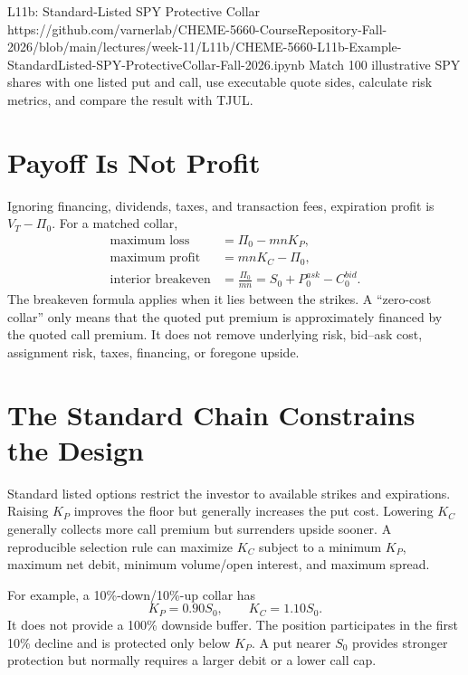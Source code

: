 \documentclass[11pt]{article}
\begin{document}
\notebooklink
  {L11b: Standard-Listed SPY Protective Collar}
  {https://github.com/varnerlab/CHEME-5660-CourseRepository-Fall-2026/blob/main/lectures/week-11/L11b/CHEME-5660-L11b-Example-StandardListed-SPY-ProtectiveCollar-Fall-2026.ipynb}
  {Match 100 illustrative SPY shares with one listed put and call, use executable quote sides, calculate risk metrics, and compare the result with TJUL.}

\section{Payoff Is Not Profit}

Ignoring financing, dividends, taxes, and transaction fees, expiration profit
is $V_T-\Pi_0$. For a matched collar,
\begin{align}
  \label{eq:risk-metrics}
  \text{maximum loss}
    &=\Pi_0-mnK_P,\\
  \text{maximum profit}
    &=mnK_C-\Pi_0,\\
  \text{interior breakeven}
    &=\frac{\Pi_0}{mn}
      =S_0+P_0^{ask}-C_0^{bid}.
\end{align}
The breakeven formula applies when it lies between the strikes. A ``zero-cost
collar'' only means that the quoted put premium is approximately financed by
the quoted call premium. It does not remove underlying risk, bid--ask cost,
assignment risk, taxes, financing, or foregone upside.

\section{The Standard Chain Constrains the Design}

Standard listed options restrict the investor to available strikes and
expirations. Raising $K_P$ improves the floor but generally increases the put
cost. Lowering $K_C$ generally collects more call premium but surrenders upside
sooner. A reproducible selection rule can maximize $K_C$ subject to a minimum
$K_P$, maximum net debit, minimum volume/open interest, and maximum spread.

For example, a 10\%-down/10\%-up collar has
\begin{equation}
  \label{eq:ten-ten}
  K_P=0.90S_0,
  \qquad K_C=1.10S_0.
\end{equation}
It does not provide a 100\% downside buffer. The position participates in the
first 10\% decline and is protected only below $K_P$. A put nearer $S_0$
provides stronger protection but normally requires a larger debit or a lower
call cap.
\end{document}
